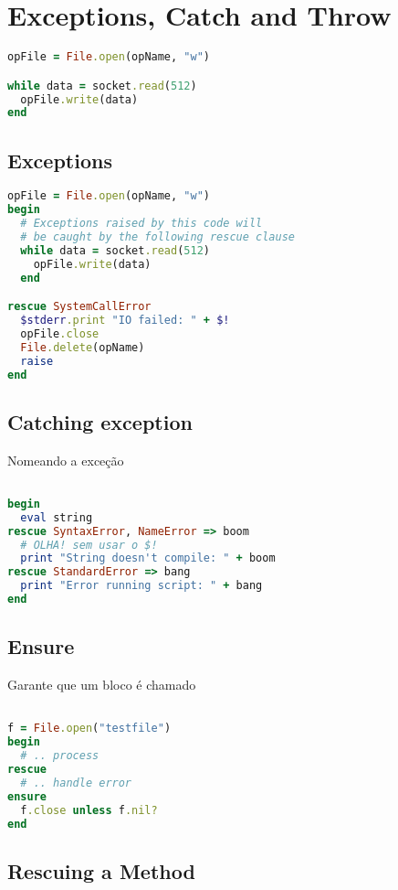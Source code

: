 \documentclass[serif,mathserif]{article}
\begin{document}
\section{Exceptions, Catch and Throw}

\begin{lstlisting}[language=ruby]
opFile = File.open(opName, "w")

while data = socket.read(512)
  opFile.write(data)
end
\end{lstlisting}

\subsection{Exceptions}

\begin{lstlisting}[language=ruby]
opFile = File.open(opName, "w")
begin
  # Exceptions raised by this code will
  # be caught by the following rescue clause
  while data = socket.read(512)
    opFile.write(data)
  end

rescue SystemCallError
  $stderr.print "IO failed: " + $!
  opFile.close
  File.delete(opName)
  raise
end
\end{lstlisting}

\subsection{Catching exception}

Nomeando a exceção

\begin{lstlisting}[language=ruby]

begin
  eval string
rescue SyntaxError, NameError => boom
  # OLHA! sem usar o $!
  print "String doesn't compile: " + boom
rescue StandardError => bang
  print "Error running script: " + bang
end
\end{lstlisting}

\subsection{Ensure}

Garante que um bloco é chamado

\begin{lstlisting}[language=ruby]

f = File.open("testfile")
begin
  # .. process
rescue
  # .. handle error
ensure
  f.close unless f.nil?
end
\end{lstlisting}

\subsection{Rescuing a Method}
\end{document}
